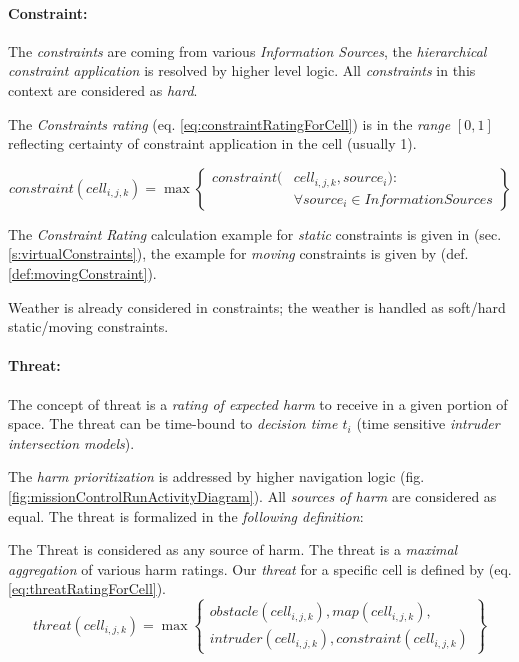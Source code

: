 \paragraph{Constraint:} The \emph{constraints} are coming from various \emph{Information Sources}, the \emph{hierarchical constraint application} is resolved by higher level logic. All \emph{constraints} in this context are considered as \emph{hard}.

The \emph{Constraints rating} (eq. \ref{eq:constraintRatingForCell}) is in the \emph{range} $[0,1]$ reflecting certainty of constraint application in the cell (usually 1).

\begin{equation}\label{eq:constraintRatingForCell}
    constraint(cell_{i,j,k}) = \max \left\{\begin{aligned}constraint(&cell_{i,j,k},source_i):\\&\forall source_i \in InformationSources\end{aligned}\right\}
\end{equation}

\noindent The \emph{Constraint Rating} calculation example for \emph{static} constraints is given in (sec. \ref{s:virtualConstraints}), the example for \emph{moving} constraints is given by (def. \ref{def:movingConstraint}).

\begin{note}{Weather}
    is already considered in constraints; the weather is handled as soft/hard static/moving constraints.
\end{note}

\paragraph{Threat:} The concept of threat is a \emph{rating of expected harm} to receive in a given portion of space. The threat can be time-bound to \emph{decision time $t_i$} (time sensitive \emph{intruder intersection models}).

The \emph{harm prioritization} is addressed by higher navigation logic (fig. \ref{fig:missionControlRunActivityDiagram}). All \emph{sources of harm} are considered as equal. The threat is formalized in the \emph{following definition}:

\begin{definition}{The Threat}\label{def:threat} is considered as any source of harm. The threat is a \emph{maximal aggregation} of various harm ratings. Our \emph{threat} for a  specific cell is defined by (eq. \ref{eq:threatRatingForCell}).
    \begin{equation}\label{eq:threatRatingForCell}
        threat(cell_{i,j,k}) = \max\left\{\begin{gathered}obstacle(cell_{i,j,k}),map(cell_{i,j,k}),\\intruder(cell_{i,j,k}),constraint(cell_{i,j,k})\end{gathered}\right\}
    \end{equation}
\end{definition}

